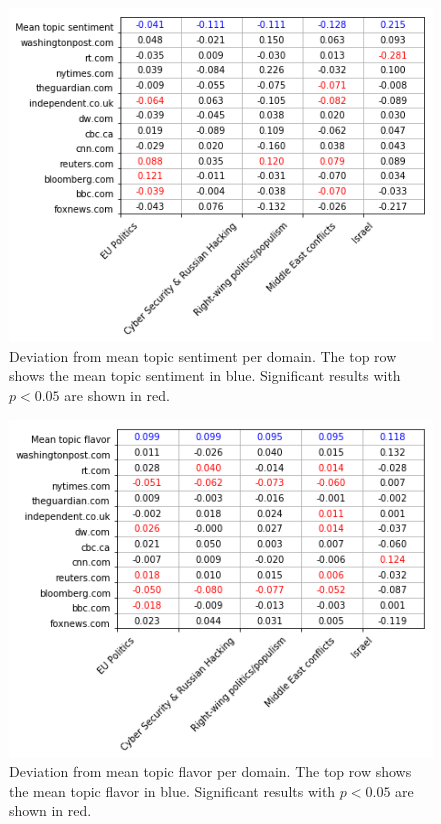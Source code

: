 \documentclass[final]{ieee}
\begin{document}
\begin{figure}[!hbt]
  
  \centering
    \includegraphics[width=\columnwidth]{mean_sent.png}
    \caption{Deviation from mean topic sentiment per domain. The top row shows the mean topic sentiment in blue. Significant results with $p < 0.05$ are shown in red.}
  \label{fig:mean_sent}
\end{figure}

\begin{figure}[!hbt]
  
  \centering
    \includegraphics[width=\columnwidth]{mean_flavor.png}
    \caption{Deviation from mean topic flavor per domain. The top row shows the mean topic flavor in blue. Significant results with $p < 0.05$ are shown in red.}
  \label{fig:mean_flavor}
\end{figure}
\end{document}
